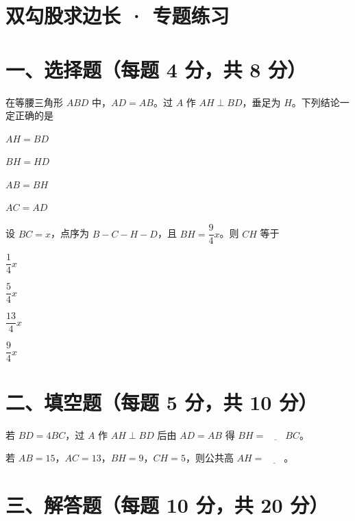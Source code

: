 \documentclass{exam-zh}
\begin{document}
\section*{双勾股求边长 · 专题练习}

\section*{一、选择题（每题 4 分，共 8 分）}


\begin{question}[points=4]
  在等腰三角形 $ABD$ 中，$AD=AB$。过 $A$ 作 $AH\perp BD$，垂足为 $H$。下列结论一定正确的是
  \begin{choices}
    \item $AH=BD$
    \item $BH=HD$
    \item $AB=BH$
    \item $AC=AD$
  \end{choices}
\end{question}



\begin{question}[points=4]
  设 $BC=x$，点序为 $B-C-H-D$，且 $BH=\dfrac94x$。则 $CH$ 等于
  \begin{choices}
    \item $\dfrac14x$
    \item $\dfrac54x$
    \item $\dfrac{13}4x$
    \item $\dfrac94x$
  \end{choices}
\end{question}


\section*{二、填空题（每题 5 分，共 10 分）}


\begin{question}[points=5]
  若 $BD=4BC$，过 $A$ 作 $AH\perp BD$ 后由 $AD=AB$ 得 $BH=\underline{\quad\quad}BC$。
\end{question}



\begin{question}[points=5]
  若 $AB=15$，$AC=13$，$BH=9$，$CH=5$，则公共高 $AH=\underline{\quad\quad}$。
\end{question}


\section*{三、解答题（每题 10 分，共 20 分）}
\end{document}
